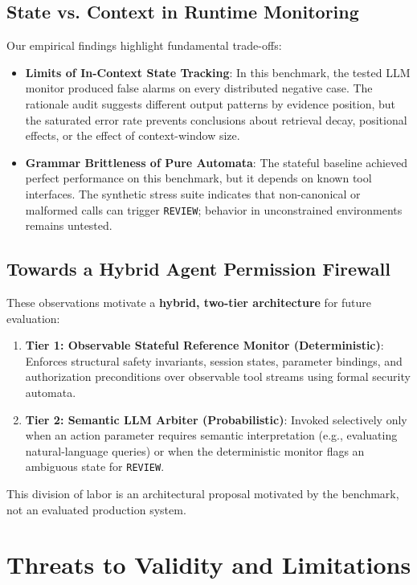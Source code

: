 \documentclass[conference]{IEEEtran}
\begin{document}
\subsection{State vs. Context in Runtime Monitoring}
Our empirical findings highlight fundamental trade-offs:
\begin{itemize}
    \item \textbf{Limits of In-Context State Tracking}: In this benchmark, the tested LLM monitor produced false alarms on every distributed negative case. The rationale audit suggests different output patterns by evidence position, but the saturated error rate prevents conclusions about retrieval decay, positional effects, or the effect of context-window size.
    \item \textbf{Grammar Brittleness of Pure Automata}: The stateful baseline achieved perfect performance on this benchmark, but it depends on known tool interfaces. The synthetic stress suite indicates that non-canonical or malformed calls can trigger \texttt{REVIEW}; behavior in unconstrained environments remains untested.
\end{itemize}

\subsection{Towards a Hybrid Agent Permission Firewall}
These observations motivate a \textbf{hybrid, two-tier architecture} for future evaluation:
\begin{enumerate}
    \item \textbf{Tier 1: Observable Stateful Reference Monitor (Deterministic)}: Enforces structural safety invariants, session states, parameter bindings, and authorization preconditions over observable tool streams using formal security automata.
    \item \textbf{Tier 2: Semantic LLM Arbiter (Probabilistic)}: Invoked selectively only when an action parameter requires semantic interpretation (e.g., evaluating natural-language queries) or when the deterministic monitor flags an ambiguous state for \texttt{REVIEW}.
\end{enumerate}
This division of labor is an architectural proposal motivated by the benchmark, not an evaluated production system.

\section{Threats to Validity and Limitations}
\end{document}

